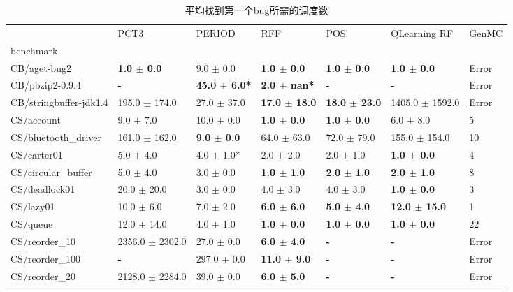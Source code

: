\begin{table}
\begin{spacing}{1.5}
\caption{\label{tab:sample}平均找到第一个bug所需的调度数}
\begin{tabular}{lllllll}
\toprule
 & PCT3 & PERIOD & RFF & POS & QLearning RF & GenMC \\
benchmark &  &  &  &  &  &  \\
\midrule
CB/aget-bug2 & \textbf{ 1.0 $\pm$ 0.0 } & 9.0 $\pm$ 0.0 & \textbf{ 1.0 $\pm$ 0.0 } & \textbf{ 1.0 $\pm$ 0.0 } & \textbf{ 1.0 $\pm$ 0.0 } & Error \\
CB/pbzip2-0.9.4 & \textbf{ - } & \textbf{ 45.0 $\pm$ 6.0* } & \textbf{ 2.0 $\pm$ nan* } & \textbf{ - } & \textbf{ - } & Error \\
CB/stringbuffer-jdk1.4 & 195.0 $\pm$ 174.0 & 27.0 $\pm$ 37.0 & \textbf{ 17.0 $\pm$ 18.0 } & \textbf{ 18.0 $\pm$ 23.0 } & 1405.0 $\pm$ 1592.0 & Error \\
CS/account & 9.0 $\pm$ 7.0 & 10.0 $\pm$ 0.0 & \textbf{ 1.0 $\pm$ 0.0 } & \textbf{ 1.0 $\pm$ 0.0 } & 6.0 $\pm$ 8.0 & 5\\
CS/bluetooth\_driver & 161.0 $\pm$ 162.0 & \textbf{ 9.0 $\pm$ 0.0 } & 64.0 $\pm$ 63.0 & 72.0 $\pm$ 79.0 & 155.0 $\pm$ 154.0 & 10 \\
CS/carter01 & 5.0 $\pm$ 4.0 & 4.0 $\pm$ 1.0* & 2.0 $\pm$ 2.0 & 2.0 $\pm$ 1.0 & \textbf{ 1.0 $\pm$ 0.0 } & 4 \\
CS/circular\_buffer & 5.0 $\pm$ 4.0 & 3.0 $\pm$ 0.0 & \textbf{ 1.0 $\pm$ 1.0 } & \textbf{ 2.0 $\pm$ 1.0 } & \textbf{ 2.0 $\pm$ 1.0 } & 8 \\
CS/deadlock01 & 20.0 $\pm$ 20.0 & 3.0 $\pm$ 0.0 & 4.0 $\pm$ 3.0 & 4.0 $\pm$ 3.0 & \textbf{ 1.0 $\pm$ 0.0 } &  3 \\
CS/lazy01 & 10.0 $\pm$ 6.0 & 7.0 $\pm$ 2.0 & \textbf{ 6.0 $\pm$ 6.0 } & \textbf{ 5.0 $\pm$ 4.0 } & \textbf{ 12.0 $\pm$ 15.0 } & 1  \\
CS/queue & 12.0 $\pm$ 14.0 & 4.0 $\pm$ 1.0 & \textbf{ 1.0 $\pm$ 0.0 } & \textbf{ 1.0 $\pm$ 0.0 } & \textbf{ 1.0 $\pm$ 0.0 } & 22  \\
CS/reorder\_10 & 2356.0 $\pm$ 2302.0 & 27.0 $\pm$ 0.0 & \textbf{ 6.0 $\pm$ 4.0 } & \textbf{ - } & \textbf{ - } & Error \\
CS/reorder\_100 & \textbf{ - } & 297.0 $\pm$ 0.0 & \textbf{ 11.0 $\pm$ 9.0 } & \textbf{ - } & \textbf{ - } & Error \\
CS/reorder\_20 & 2128.0 $\pm$ 2284.0 & 39.0 $\pm$ 0.0 & \textbf{ 6.0 $\pm$ 5.0 } & \textbf{ - } & \textbf{ - } & Error \\

\end{tabular}
\end{spacing}
\end{table}
